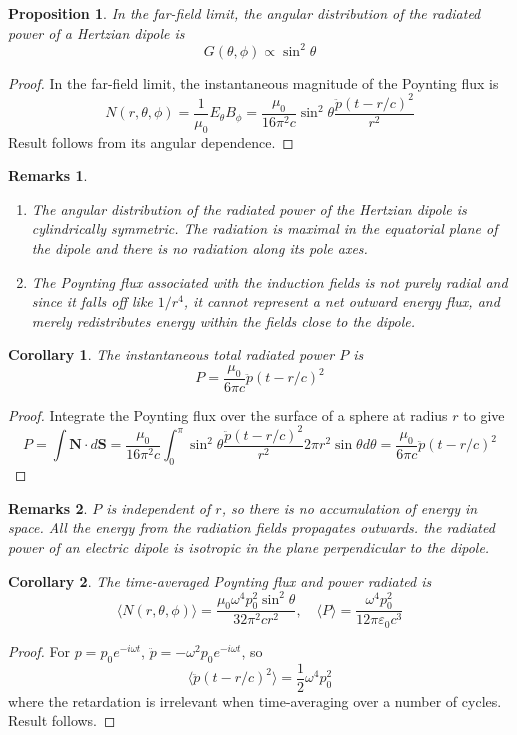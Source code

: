 \documentclass[a4paper]{article}
\newtheorem{remarks}{Remarks}[section]
\theoremstyle{new}
\newtheorem{prop}{Proposition}[section]
\newtheorem{cor}{Corollary}[section]
\begin{document}
\begin{prop}
In the far-field limit, the angular distribution of the radiated power of a Hertzian dipole is 
$$G(\theta,\phi)\propto\sin^2\theta$$
\end{prop}
\begin{proof}
In the far-field limit, the instantaneous magnitude of the Poynting flux is 
$$N(r,\theta,\phi)=\frac{1}{\mu_0}E_\theta B_\phi=\frac{\mu_0}{16\pi^2c}\sin^2\theta\frac{\ddot{p}(t-r/c)^2}{r^2}$$
Result follows from its angular dependence.
\end{proof}
\begin{remarks}\leavevmode
\begin{enumerate}
\item The angular distribution of the radiated power of the Hertzian dipole is cylindrically symmetric. The radiation is maximal in the equatorial plane of the dipole and there is no radiation along its pole axes.
\item The Poynting flux associated with the induction fields is not purely radial and since it falls off like $1/r^4$, it cannot represent a net outward energy flux, and merely redistributes energy within the fields close to the dipole.
\end{enumerate}
\end{remarks}
\begin{cor}
The instantaneous total radiated power $P$ is
$$P=\frac{\mu_0}{6\pi c}\ddot{p}(t-r/c)^2$$
\end{cor}
\begin{proof}
Integrate the Poynting flux over the surface of a sphere at radius $r$ to give
$$P=\int\mathbf{N}\cdot d\mathbf{S}=\frac{\mu_0}{16\pi^2c}\int_0^\pi\sin^2\theta\frac{\ddot{p}(t-r/c)^2}{r^2}2\pi r^2\sin\theta d\theta=\frac{\mu_0}{6\pi c}\ddot{p}(t-r/c)^2$$
\end{proof}
\begin{remarks}
$P$ is independent of $r$, so there is no accumulation of energy in space. All the energy from the radiation fields propagates outwards. the radiated power of an electric dipole is isotropic in the plane perpendicular to the dipole.
\end{remarks}
\begin{cor}
The time-averaged Poynting flux and power radiated is
$$\langle N(r,\theta,\phi)\rangle=\frac{\mu_0\omega^4p_0^2\sin^2\theta}{32\pi^2cr^2},\quad\langle P\rangle=\frac{\omega^4p_0^2}{12\pi\varepsilon_0c^3}$$
\end{cor}
\begin{proof}
For $p=p_0e^{-i\omega t}$, $\ddot{p}=-\omega^2p_0e^{-i\omega t}$, so
$$\langle\ddot{p}(t-r/c)^2\rangle=\frac{1}{2}\omega^4p_0^2$$
where the retardation is irrelevant when time-averaging over a number of cycles. Result follows.
\end{proof}
\end{document}
